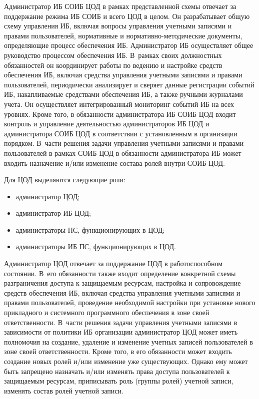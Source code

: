 \begin{multicols}{2}
       Администратор ИБ СОИБ ЦОД в рамках представленной схемы отвечает за 
поддержание режима ИБ СОИБ и всего ЦОД в целом. Он разрабатывает общую схему 
управления ИБ, включая вопросы управления учетными 
записями и правами пользователей, нормативные и нор\-ма\-тив\-но-ме\-то\-ди\-че\-ские документы, 
определяющие процесс обеспечения ИБ. Администратор ИБ
осуществляет общее руководство процессом 
обеспечения ИБ. В~рамках своих должностных обязанностей он координирует работы по 
ведению и настройке средств обеспечения ИБ, включая средства управления учетными 
записями и правами пользователей, периодически анализирует и сверяет данные 
регистрации событий ИБ, накапливаемые средствами обеспечения ИБ, а также ручными 
журналами учета. Он осуществляет интегрированный мониторинг событий ИБ на всех 
уровнях. Кроме того, в обязанности администратора ИБ СОИБ ЦОД входит контроль и 
управление деятельностью администраторов ИБ ЦОД и администратора СОИБ ЦОД в 
соответствии с уста\-нов\-лен\-ным в организации порядком. В~час\-ти решения задачи 
управления учетными записями и правами пользователей в рамках СОИБ ЦОД в 
обязанности администратора ИБ может входить назначение и/или изменение состава 
ролей внутри СОИБ ЦОД.
       
       Для ЦОД выделяются следующие роли:
       \begin{itemize}
\item администратор ЦОД;
\item администратор ИБ ЦОД;
\item администраторы ПС, функционирующих в ЦОД;
\item администраторы ИБ ПС, функционирующих в ЦОД.
\end{itemize}

       Администратор ЦОД отвечает за поддержание ЦОД в работоспособном 
состоянии. В~его обязанности также входит определение конкретной схемы 
разграничения доступа к защищаемым ресурсам, настройка и сопровождение средств 
обеспечения ИБ, включая средства управления учетными записями и правами 
пользователей, проведение необходимой настройки при уста\-нов\-ке нового прикладного и 
сис\-тем\-но\-го программного обеспечения 
в зоне своей ответственности. В~час\-ти решения задачи управ\-ле\-ния 
учетными записями в зависимости от политики ИБ организации администратор ЦОД 
может иметь полномочия на создание, удаление и изменение учетных записей 
пользователей в зоне своей ответственности. Кроме того, в его обязанности может 
входить создание новых ролей и/или изменение уже существующих. Однако ему может 
быть запрещено назначать и/или изменять права доступа пользователей к защищаемым 
ресурсам, приписывать роль (группы ролей) учетной записи, изменять состав ролей 
учетной записи.
       

\end{multicols}
